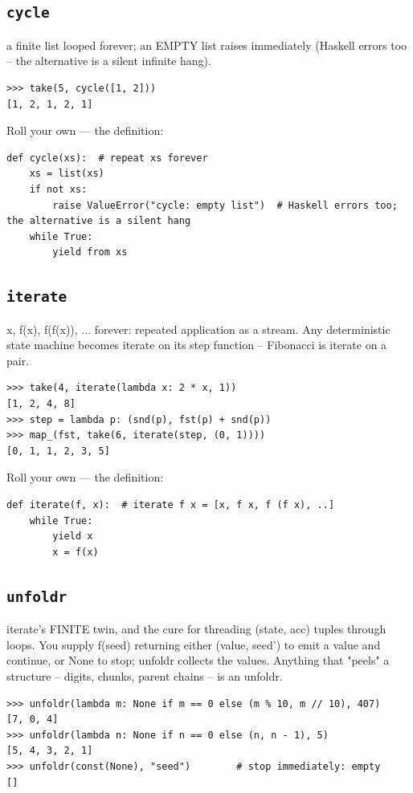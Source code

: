 \documentclass[10pt,letterpaper]{book}
\begin{document}
\subsection{\texttt{cycle}}\label{def:cycle}
a finite list looped forever; an EMPTY list raises immediately (Haskell errors too -- the alternative is a silent infinite hang).
\begin{lstlisting}[style=ex]
>>> take(5, cycle([1, 2]))
[1, 2, 1, 2, 1]
\end{lstlisting}

Roll your own --- the definition:

\begin{lstlisting}[style=ex]
def cycle(xs):  # repeat xs forever
    xs = list(xs)
    if not xs:
        raise ValueError("cycle: empty list")  # Haskell errors too; the alternative is a silent hang
    while True:
        yield from xs
\end{lstlisting}

\subsection{\texttt{iterate}}\label{def:iterate}
x, f(x), f(f(x)), ... forever: repeated application as a stream. Any deterministic state machine becomes iterate on its step function -- Fibonacci is iterate on a pair.
\begin{lstlisting}[style=ex]
>>> take(4, iterate(lambda x: 2 * x, 1))
[1, 2, 4, 8]
>>> step = lambda p: (snd(p), fst(p) + snd(p))
>>> map_(fst, take(6, iterate(step, (0, 1))))
[0, 1, 1, 2, 3, 5]
\end{lstlisting}

Roll your own --- the definition:

\begin{lstlisting}[style=ex]
def iterate(f, x):  # iterate f x = [x, f x, f (f x), ..]
    while True:
        yield x
        x = f(x)
\end{lstlisting}

\subsection{\texttt{unfoldr}}\label{def:unfoldr}
iterate's FINITE twin, and the cure for threading (state, acc) tuples through loops. You supply f(seed) returning either (value, seed') to emit a value and continue, or None to stop; unfoldr collects the values. Anything that "peels" a structure -- digits, chunks, parent chains -- is an unfoldr.
\begin{lstlisting}[style=ex]
>>> unfoldr(lambda m: None if m == 0 else (m % 10, m // 10), 407)
[7, 0, 4]
>>> unfoldr(lambda n: None if n == 0 else (n, n - 1), 5)
[5, 4, 3, 2, 1]
>>> unfoldr(const(None), "seed")        # stop immediately: empty
[]
\end{lstlisting}
\end{document}
